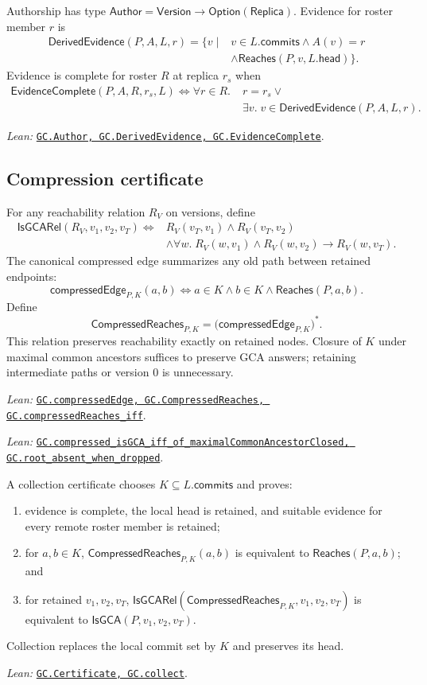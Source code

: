 \documentclass[11pt]{article}
\theoremstyle{definition}
\newcommand{\Replica}{\mathsf{Replica}}
\newcommand{\Version}{\mathsf{Version}}
\newcommand{\src}[2]{\href{../../#1}{\texttt{#2}}}
\newcommand{\anchor}[2]{\par\smallskip\noindent\emph{Lean: }\src{#1}{#2}.}
\begin{document}
Authorship has type
$\mathsf{Author}=\Version\to\mathsf{Option}(\Replica)$. Evidence for roster
member $r$ is
\[
\begin{aligned}
 \mathsf{DerivedEvidence}(P,A,L,r)=\{v\mid{}&
 v\in L.\mathsf{commits}\land A(v)=r\\
 &\land\mathsf{Reaches}(P,v,L.\mathsf{head})\}.
\end{aligned}
\]
Evidence is complete for roster $R$ at replica $r_s$ when
\[
\begin{aligned}
 \mathsf{EvidenceComplete}(P,A,R,r_s,L)\Longleftrightarrow
 \forall r\in R.\;&r=r_s\lor\\
 &\exists v.\;v\in\mathsf{DerivedEvidence}(P,A,L,r).
\end{aligned}
\]
\anchor{Sal/MRDTs/GC/Distributed.lean}
  {GC.Author, GC.DerivedEvidence, GC.EvidenceComplete}

\subsection{Compression certificate}

For any reachability relation $R_V$ on versions, define
\[
\begin{aligned}
 \mathsf{IsGCARel}(R_V,v_1,v_2,v_T)\Longleftrightarrow{}&
 R_V(v_T,v_1)\land R_V(v_T,v_2)\\
 &\land\forall w.\;R_V(w,v_1)\land R_V(w,v_2)
   \to R_V(w,v_T).
\end{aligned}
\]
The canonical compressed edge summarizes any old path between retained
endpoints:
\[
 \mathsf{compressedEdge}_{P,K}(a,b)
 \Longleftrightarrow a\in K\land b\in K\land\mathsf{Reaches}(P,a,b).
\]
Define
\[
 \mathsf{CompressedReaches}_{P,K}
 =\bigl(\mathsf{compressedEdge}_{P,K}\bigr)^*.
\]
This relation preserves reachability exactly on retained nodes. Closure of
$K$ under maximal common ancestors suffices to preserve GCA answers; retaining
intermediate paths or version $0$ is unnecessary.
\anchor{Sal/MRDTs/GC/CompressedDAG.lean}
  {GC.compressedEdge, GC.CompressedReaches, GC.compressedReaches\_iff}
\anchor{Sal/MRDTs/GC/CompressedDAG.lean}
  {GC.compressed\_isGCA\_iff\_of\_\allowbreak maximalCommonAncestorClosed,
   GC.root\_absent\_when\_dropped}

A collection certificate chooses $K\subseteq L.\mathsf{commits}$ and proves:
\begin{enumerate}
\item evidence is complete, the local head is retained, and suitable evidence
  for every remote roster member is retained;
\item for $a,b\in K$,
  $\mathsf{CompressedReaches}_{P,K}(a,b)$ is equivalent to
  $\mathsf{Reaches}(P,a,b)$; and
\item for retained $v_1,v_2,v_T$,
  $\mathsf{IsGCARel}(\mathsf{CompressedReaches}_{P,K},v_1,v_2,v_T)$ is
  equivalent to $\mathsf{IsGCA}(P,v_1,v_2,v_T)$.
\end{enumerate}
Collection replaces the local commit set by $K$ and preserves its head.
\anchor{Sal/MRDTs/GC/Distributed.lean}
  {GC.Certificate, GC.collect}
\end{document}
